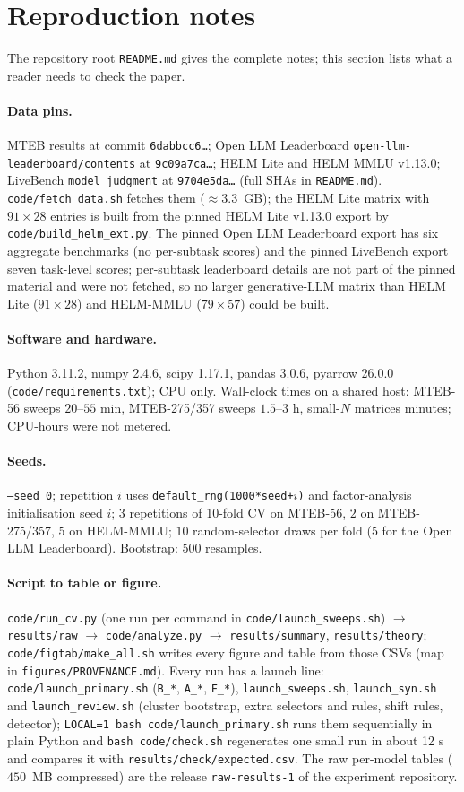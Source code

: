 \section{Reproduction notes}
\label{app:repro}
The repository root \texttt{README.md} gives the complete notes; this section lists what a reader needs to check the paper.
\paragraph{Data pins.} MTEB results at commit \texttt{6dabbcc6\ldots}; Open LLM Leaderboard \texttt{open-llm-leaderboard/contents} at \texttt{9c09a7ca\ldots}; HELM Lite and HELM MMLU v1.13.0; LiveBench \texttt{model\_judgment} at \texttt{9704e5da\ldots} (full SHAs in \texttt{README.md}). \texttt{code/fetch\_data.sh} fetches them ($\approx3.3$~GB); the HELM Lite matrix with $91\times28$ entries is built from the pinned HELM Lite v1.13.0 export by \texttt{code/build\_helm\_ext.py}. The pinned Open LLM Leaderboard export has six aggregate benchmarks (no per-subtask scores) and the pinned LiveBench export seven task-level scores; per-subtask leaderboard details are not part of the pinned material and were not fetched, so no larger generative-LLM matrix than HELM Lite ($91\times28$) and HELM-MMLU ($79\times57$) could be built.
\paragraph{Software and hardware.} Python 3.11.2, numpy 2.4.6, scipy 1.17.1, pandas 3.0.6, pyarrow 26.0.0 (\texttt{code/requirements.txt}); CPU only. Wall-clock times on a shared host: MTEB-56 sweeps $20$--$55$ min, MTEB-275/357 sweeps $1.5$--$3$ h, small-$N$ matrices minutes; CPU-hours were not metered.
\paragraph{Seeds.} \texttt{--seed 0}; repetition $i$ uses \texttt{default\_rng(1000*seed+$i$)} and factor-analysis initialisation seed $i$; $3$ repetitions of 10-fold CV on MTEB-56, $2$ on MTEB-275/357, $5$ on HELM-MMLU; $10$ random-selector draws per fold ($5$ for the Open LLM Leaderboard). Bootstrap: $500$ resamples.
\paragraph{Script to table or figure.} \texttt{code/run\_cv.py} (one run per command in \texttt{code/launch\_sweeps.sh}) $\to$ \texttt{results/raw} $\to$ \texttt{code/analyze.py} $\to$ \texttt{results/summary}, \texttt{results/theory}; \texttt{code/figtab/make\_all.sh} writes every figure and table from those CSVs (map in \texttt{figures/PROVENANCE.md}). Every run has a launch line: \texttt{code/launch\_primary.sh} (\texttt{B\_*}, \texttt{A\_*}, \texttt{F\_*}), \texttt{launch\_sweeps.sh}, \texttt{launch\_syn.sh} and \texttt{launch\_review.sh} (cluster bootstrap, extra selectors and rules, shift rules, detector); \texttt{LOCAL=1 bash code/launch\_primary.sh} runs them sequentially in plain Python and \texttt{bash code/check.sh} regenerates one small run in about 12 s and compares it with \texttt{results/check/expected.csv}. The raw per-model tables ($450$~MB compressed) are the release \texttt{raw-results-1} of the experiment repository.

